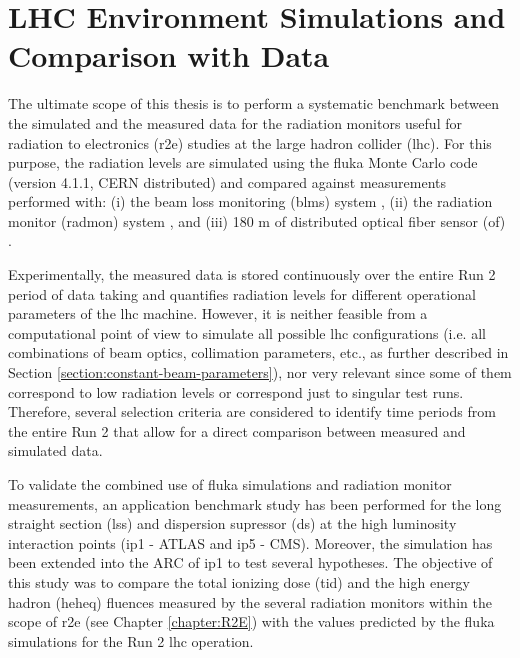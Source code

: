 \documentclass[encoding=utf8,british]{tumphthesis}
\begin{document}
\chapter{LHC Environment Simulations and Comparison with Data}
\label{chapter:LHC-results}

The ultimate scope of this thesis is to perform a systematic benchmark between the simulated and the measured data for the radiation monitors useful for radiation to electronics (\acrshort{r2e}) studies at the large hadron collider (\acrshort{lhc}). For this purpose, the radiation levels are simulated using the \acrshort{fluka} Monte Carlo code (version 4.1.1, CERN distributed) and compared against measurements performed with: (i) the beam loss monitoring (\acrshort{blm}s) system \cite{BLM:description}, (ii) the  radiation monitor (\acrshort{radmon}) system \cite{description:RadMON}, and (iii) 180 m of distributed optical fiber sensor (\acrshort{of}) \cite{Diego:OF}. 

Experimentally, the measured data is stored continuously over the entire Run 2 period of data taking and quantifies radiation levels for different operational parameters of the \acrshort{lhc} machine. However, it is neither feasible from a computational point of view to simulate all possible \acrshort{lhc} configurations (i.e. all combinations of beam optics, collimation parameters, etc., as further described in Section \ref{section:constant-beam-parameters}), nor very relevant since some of them correspond to low radiation levels or correspond just to singular test runs. Therefore, several selection criteria are considered to identify time periods from the entire Run 2 that allow for a direct comparison between measured and simulated data. 

To validate the combined use of \acrshort{fluka} simulations and radiation monitor measurements, an application benchmark study has been performed for the long straight section (\acrshort{lss}) and dispersion supressor (\acrshort{ds}) at the high luminosity interaction points (\acrshort{ip}1 - ATLAS and \acrshort{ip}5 - CMS). Moreover, the simulation has been extended into the ARC of \acrshort{ip}1 to test several hypotheses. The objective of this study was to compare the total ionizing dose (\acrshort{tid}) and the high energy hadron (\acrshort{heheq}) fluences measured by the several radiation monitors within the scope of \acrshort{r2e} (see Chapter \ref{chapter:R2E}) with the values predicted by the \acrshort{fluka} simulations for the Run 2 \acrshort{lhc} operation.
\end{document}
